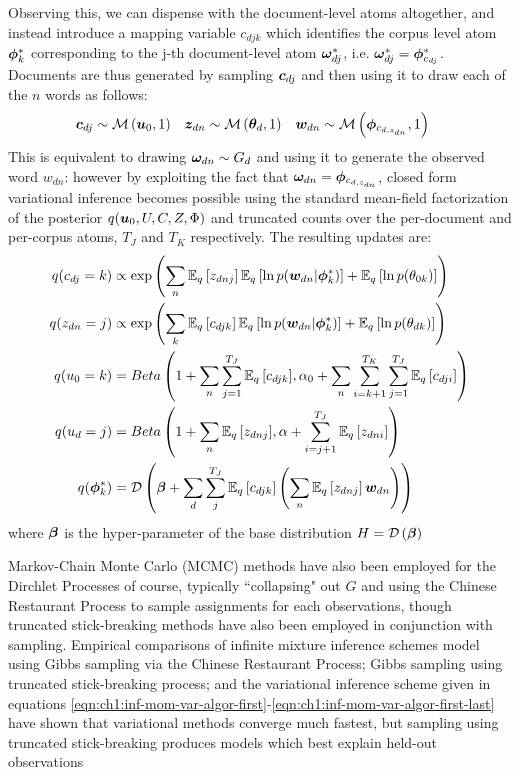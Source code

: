 Observing this, we can dispense with the document-level atoms altogether, and instead introduce a mapping variable $c_{djk}$ which identifies the corpus level atom $\vv{\phi}_k^*$ corresponding to the j-th document-level atom $\vv{\omega}_{dj}^*$, i.e. $\vv{\omega}_{dj}^* = \vv{\phi}_{c_{dj}}^*$. Documents are thus generated by sampling $\vv{c}_{dj}$ and then using it to draw each of the $n$ words as follows:
\begin{align}
\vv{c}_{dj} & \sim \muln{\vv{u}_0}{1} &
\vv{z}_{dn} & \sim \muln{\thd}{1} &
\vv{w}_{dn} & \sim \muln{\vv{\phi}_{c_{d,z_{dn}}}}{1}
\end{align}
This is equivalent to drawing $\vv{\omega}_{dn} \sim G_d$ and using it to generate the observed word $w_{dn}$: however by exploiting the fact that $\vv{\omega}_{dn} = \vv{\phi}_{c_{d,z_{dn}}}$, closed form variational inference becomes possible using the standard mean-field factorization of the posterior $q(\vv{u}_0, U, C,Z,\Phi)$ and truncated counts over the per-document and per-corpus atoms, $T_J$ and $T_K$ respectively. The resulting updates are:
\begin{align}
q(c_{dj} = k) & \propto \exp\left(\sum_n \ex{z_{dnj}}{q} \ex{\ln p(\wdn|\vv{\phi}^*_k)}{q} + \ex{\ln p(\theta_{0k})}{q}  \right) \\
q(z_{dn} = j) & \propto \exp\left(\sum_k \ex{c_{djk}}{q} \ex{\ln p(\wdn|\vv{\phi}^*_k)}{q} + \ex{\ln p(\theta_{dk})}{q} \right) \\
q(u_{0} = k) & = 
    \betadist{
        1 + \sum_n \sum_{j=1}^{T_J}\ex{c_{djk}}{q}
    }{
       \alpha_0 + \sum_n \sum_{i=k+1}^{T_K} \sum_{j=1}^{T_J}  \ex{c_{dji}}{q}
    } \\
q(u_{d} = j) & = \betadist{1 + \sum_n \ex{z_{dnj}}{q}}{\alpha + \sum_{i=j+1}^{T_J} \ex{z_{dni}}{q}} \\
q(\vv{\phi}^*_k) & = \dir{ 
    \vv{\beta} + \sum_d \sum_j^{T_J} \ex{c_{djk}}{q} \left(
        \sum_n \ex{z_{dnj}}{q} \wdn
    \right)
}
\end{align}
where $\vv{\beta}$ is the hyper-parameter of the base distribution $H = \dir{\vv{\beta}}$


Markov-Chain Monte Carlo (MCMC) methods have also been employed for the Dirchlet Processes of course, typically ``collapsing" out $G$ and using the Chinese Restaurant Process to sample assignments for each observations\cite{MacEachern1994}\cite{Escobar1995}\cite{Neal2000}, though truncated stick-breaking methods have also been employed in conjunction with sampling\cite{Ishwaran2001}. Empirical comparisons of infinite mixture inference schemes model using Gibbs sampling via the Chinese Restaurant Process; Gibbs sampling using truncated stick-breaking process; and the variational inference scheme given in equations \eqref{eqn:ch1:inf-mom-var-algor-first}-\eqref{eqn:ch1:inf-mom-var-algor-first-last} have shown that variational methods converge much fastest, but sampling using truncated stick-breaking produces models which best explain held-out observations\cite{Blei2006b}

